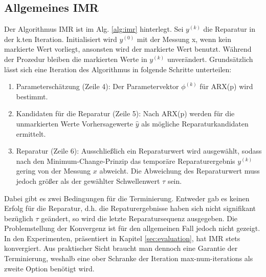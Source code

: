 \subsection{Allgemeines IMR}
\label{sec:allgemeinimr}
Der Algorithmus IMR ist im Alg. \ref{alg:imr} hinterlegt.  Sei $y^{(k)}$ die
Reparatur in der k.ten Iteration. Initialisiert wird $y^{(0)}$ mit der Messung
x, wenn kein markierte Wert vorliegt, ansonsten wird der markierte Wert
benutzt. Während der Prozedur bleiben die markierten Werte in $y^{(k)}$
unverändert.  Grundsätzlich lässt sich eine Iteration des Algorithmus in
folgende Schritte unterteilen:
\begin{enumerate}
    \item Parameterschätzung (Zeile 4): Der Parametervektor $\phi^{(k)}$ für ARX(p) wird
bestimmt.
    \item Kandidaten für die Reparatur (Zeile 5): Nach ARX(p) werden für die unmarkierten
        Werte Vorhersagewerte $\hat{y}$ als mögliche Reparaturkandidaten ermittelt.
    \item Reparatur (Zeile 6): Ausschließlich ein Reparaturwert wird
        ausgewählt, sodass nach den Minimum-Change-Prinzip das temporäre
        Reparaturergebnis $y^{(k)}$ gering von der Messung $x$ abweicht. Die
        Abweichung des Reparaturwert muss jedoch größer als der gewählter
        Schwellenwert $\tau$ sein.
\end{enumerate}
Dabei gibt es zwei Bedingungen für die Terminierung. Entweder gab es keinen
Erfolg für die Reparatur, d.h. die Repaturergebnisse haben sich nicht
signifikant bezüglich $\tau$ geändert, so wird die letzte Reparatursequenz
ausgegeben. Die Problemstellung der Konvergenz ist für den allgemeinen Fall
jedoch nicht gezeigt. In den Experimenten, präsentiert in Kapitel
\ref{sec:evaluation}, hat IMR stets konvergiert. Aus praktischer Sicht braucht
man dennoch eine Garantie der Terminierung, weshalb eine ober Schranke der Iteration
max-num-iterations als zweite Option benötigt wird. 

